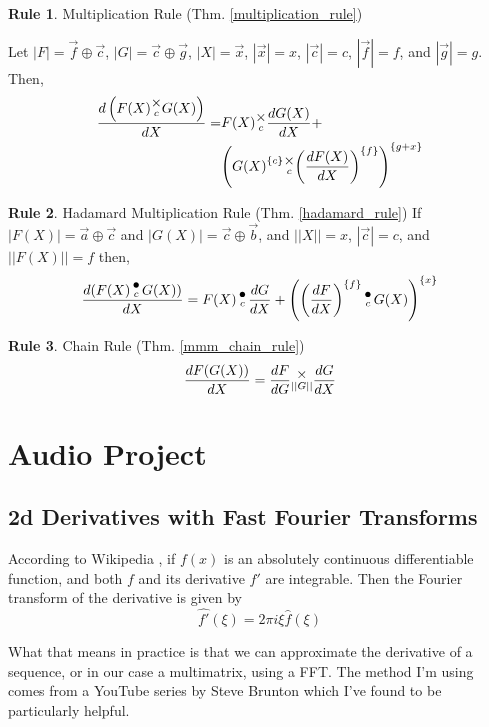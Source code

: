 \documentclass[12pt]{book}
\theoremstyle{plain}
\theoremstyle{definition}
\newtheorem{drule}{Rule}
\theoremstyle{ppart}
\theoremstyle{case}
\theoremstyle{solution}
\newcommand{\mmult}[1]{\text{\raisebox{1ex}{$\underset{#1}{\times}$}}}
\newcommand{\dmult}[1]{\text{\raisebox{1ex}{$\underset{#1}{\,\bullet\,}$}}}
\newcommand{\shape}[1]{\left|#1\right|}
\newcommand{\transpose}[2]{{#1}^{\{#2\}}}
\begin{document}
\begin{appendices}
\begin{drule}
Multiplication Rule
(Thm. \ref{multiplication_rule})

Let $\shape{F} = \vec{f} \oplus \vec{c}$, $\shape{G} = \vec{c} \oplus \vec{g}$,
$\shape{X} = \vec{x}$, $\shape{\vec{x}} = x$, $\shape{\vec{c}} = c$, $\shape{\vec{f}} = f$, and $\shape{\vec{g}} = g$. Then,
\begin{align*}
 \frac{d\left(F(X) \mmult{c} G(X)\right)}{dX} =&
 F(X) \mmult{c} \frac{dG(X)}{dX} + \\
 &\transpose{\left(
   \transpose{G(X)}{c}
     \mmult{c}
   \transpose{\left(
      \frac{dF(X)}{dX}
   \right)}{f}
  \right)}{g+x}
\end{align*}
\end{drule}

\begin{drule}
Hadamard Multiplication Rule
(Thm. \ref{hadamard_rule})
If $\shape{F(X)} = \vec{a} \oplus \vec{c}$ and $\shape{G(X)} = \vec{c} \oplus \vec{b}$,
and $\shape{\shape{X}} = x$, $\shape{\vec{c}} = c$, and $\shape{\shape{F(X)}} = f$ then,
\[
  \frac{d(F(X) \dmult{c} G(X))}{dX} =
    F(X) \dmult{c} \frac{dG}{dX} +
    \transpose{\left(
      \transpose{\left(\frac{dF}{dX}\right)}{f} \dmult{c} G(X)
    \right)}{x}
\]
\end{drule}

\begin{drule}
Chain Rule
(Thm. \ref{mmm_chain_rule})
\[ \frac{dF(G(X))}{dX} = \frac{dF}{dG} \mmult{\shape{\shape{G}}} \frac{dG}{dX} \]
\end{drule}

\chapter{Audio Project}

\begin{landscape}
\section{2d Derivatives with Fast Fourier Transforms}

According to Wikipedia \cite{wiki:fourier}, if $f(x)$ is an absolutely continuous differentiable function, and both $f$ and its derivative $f'$ are integrable. Then the Fourier transform of the derivative is given by
\[ \hat{f'}(\xi) = 2 \pi i \xi \hat{f}(\xi) \]

What that means in practice is that we can approximate the derivative of a sequence, or in our case a multimatrix, using a FFT.
The method I'm using comes from a YouTube series by Steve Brunton \cite{youtube:fourier} which I've found to be particularly helpful.


\end{landscape}
\end{appendices}
\end{document}
